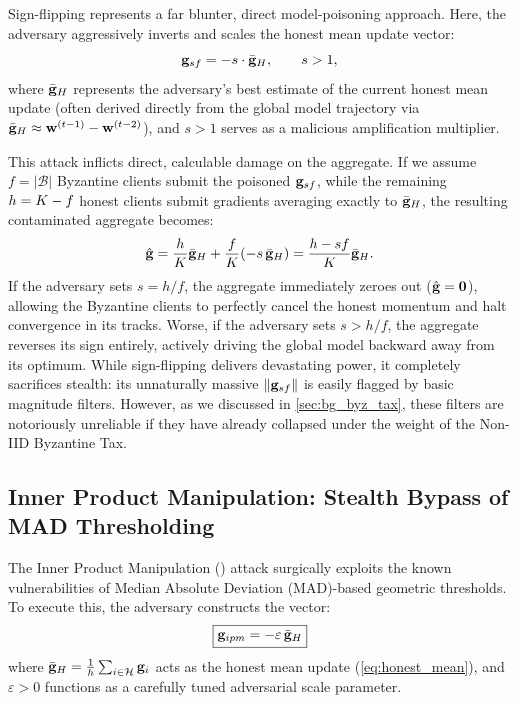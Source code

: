 \documentclass[../main]{subfiles}
\begin{document}
Sign-flipping represents a far blunter, direct model-poisoning approach. Here, the adversary aggressively inverts and scales the honest mean update vector:
\begin{equation}
    \mathbf{g}_{sf} = -s \cdot \bar{\mathbf{g}}_{H},
    \qquad s > 1,
    \label{eq:sign_flip}
\end{equation}
where $\bar{\mathbf{g}}_{H}$ represents the adversary's best estimate of the current honest mean update (often derived directly from the global model trajectory via $\bar{\mathbf{g}}_{H} \approx \mathbf{w}^{(t-1)} - \mathbf{w}^{(t-2)}$), and $s > 1$ serves as a malicious amplification multiplier.

This attack inflicts direct, calculable damage on the aggregate. If we assume $f = |\mathcal{B}|$ Byzantine clients submit the poisoned $\mathbf{g}_{sf}$, while the remaining $h = K - f$ honest clients submit gradients averaging exactly to $\bar{\mathbf{g}}_{H}$, the resulting contaminated aggregate becomes:
\begin{equation}
    \hat{\mathbf{g}} = \frac{h}{K}\bar{\mathbf{g}}_{H} + \frac{f}{K}(-s\,\bar{\mathbf{g}}_{H}) = \frac{h - s f}{K}\bar{\mathbf{g}}_{H}.
    \label{eq:sign_flip_aggregate}
\end{equation}
If the adversary sets $s = h/f$, the aggregate immediately zeroes out ($\hat{\mathbf{g}} = \mathbf{0}$), allowing the Byzantine clients to perfectly cancel the honest momentum and halt convergence in its tracks. Worse, if the adversary sets $s > h/f$, the aggregate reverses its sign entirely, actively driving the global model backward away from its optimum. While sign-flipping delivers devastating power, it completely sacrifices stealth: its unnaturally massive $\left\lVert \mathbf{g}_{sf} \right\rVert$ is easily flagged by basic magnitude filters. However, as we discussed in \cref{sec:bg_byz_tax}, these filters are notoriously unreliable if they have already collapsed under the weight of the Non-IID Byzantine Tax.

\subsection{Inner Product Manipulation: Stealth Bypass of MAD Thresholding}
\label{sec:attack_ipm}

The Inner Product Manipulation (\ipm{}) attack \citep{xie2020fall} surgically exploits the known vulnerabilities of Median Absolute Deviation (MAD)-based geometric thresholds. To execute this, the adversary constructs the vector:
\begin{equation}
    \boxed{\mathbf{g}_{ipm} = -\varepsilon\,\bar{\mathbf{g}}_{H}}
    \label{eq:ipm}
\end{equation}
where $\bar{\mathbf{g}}_{H} = \frac{1}{h} \sum_{i \in \mathcal{H}} \mathbf{g}_{i}$ acts as the honest mean update (\cref{eq:honest_mean}), and $\varepsilon > 0$ functions as a carefully tuned adversarial scale parameter.
\end{document}
